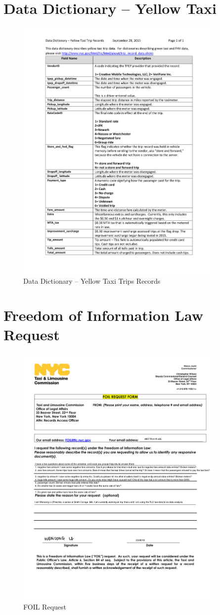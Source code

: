 \documentclass[12pt,twoside]{reedthesis}
\theoremstyle{definition}
\theoremstyle{definition}
\theoremstyle{definition}
\theoremstyle{remark}
\begin{document}
\chapter{Data Dictionary -- Yellow
Taxi}\label{data-dictionary-yellow-taxi}
\begin{figure}
  \centering
  \includegraphics[width=4in]{figure/data_dictionary_trip_records_yellow.pdf}
  \caption{Data Dictionary -- Yellow Taxi Trips Records}
\end{figure}
\chapter{Freedom of Information Law
Request}\label{freedom-of-information-law-request}
\begin{figure}
  \centering
  \includegraphics[width=4in]{figure/appendix_foil_form_doc.pdf}
  \caption{FOIL Request}
\end{figure}
\end{document}
